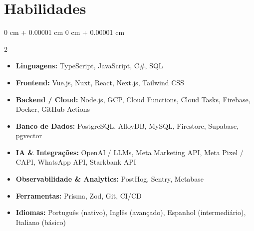 \documentclass[10pt, a4paper]{article}
\newenvironment{onecolentry}{
    \begin{adjustwidth}{
        0 cm + 0.00001 cm
    }{
        0 cm + 0.00001 cm
    }
}{
    \end{adjustwidth}
}
\begin{document}
    \section{Habilidades}
    \vspace{0.1 cm}
    \begin{onecolentry}
        \setlength{\columnsep}{0.5cm}
        \begin{multicols}{2}
        \begin{itemize}[topsep=0.04cm, parsep=0.04cm, partopsep=0pt, itemsep=0pt, leftmargin=0cm+10pt]
            \item \textbf{Linguagens:} TypeScript, JavaScript, C\#, SQL
            \item \textbf{Frontend:} Vue.js, Nuxt, React, Next.js, Tailwind CSS
            \item \textbf{Backend / Cloud:} Node.js, GCP, Cloud Functions, Cloud Tasks, Firebase, Docker, GitHub Actions
            \item \textbf{Banco de Dados:} PostgreSQL, AlloyDB, MySQL, Firestore, Supabase, pgvector
            \columnbreak
            \item \textbf{IA \& Integrações:} OpenAI / LLMs, Meta Marketing API, Meta Pixel / CAPI, WhatsApp API, Starkbank API
            \item \textbf{Observabilidade \& Analytics:} PostHog, Sentry, Metabase
            \item \textbf{Ferramentas:} Prisma, Zod, Git, CI/CD
            \item \textbf{Idiomas:} Português (nativo), Inglês (avançado), Espanhol (intermediário), Italiano (básico)
        \end{itemize}
        \end{multicols}
    \end{onecolentry}
\end{document}

